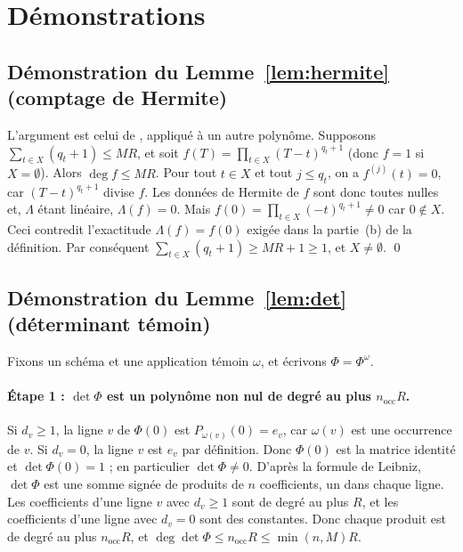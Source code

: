 \documentclass[11pt,a4paper]{article}
\theoremstyle{definition}
\theoremstyle{remark}
\newcommand{\nocc}{n_{\mathrm{occ}}}
\begin{document}
\section{Démonstrations}\label{sec:proofs}

\subsection{Démonstration du Lemme~\ref{lem:hermite} (comptage de Hermite)}

L'argument est celui de \cite[Lemme~6.2]{DL}, appliqué à un autre polynôme. Supposons
$\sum_{t\in X}(q_t+1)\le MR$, et soit $f(T)=\prod_{t\in X}(T-t)^{q_t+1}$ (donc $f=1$ si
$X=\emptyset$). Alors $\deg f\le MR$. Pour tout $t\in X$ et tout $j\le q_t$, on a
$f^{(j)}(t)=0$, car $(T-t)^{q_t+1}$ divise $f$. Les données de Hermite de $f$ sont donc
toutes nulles et, $\Lambda$ étant linéaire, $\Lambda(f)=0$. Mais
$f(0)=\prod_{t\in X}(-t)^{q_t+1}\ne0$ car $0\notin X$. Ceci contredit l'exactitude
$\Lambda(f)=f(0)$ exigée dans la partie~(b) de la définition. Par conséquent
$\sum_{t\in X}(q_t+1)\ge MR+1\ge1$, et $X\ne\emptyset$. \qed

\subsection{Démonstration du Lemme~\ref{lem:det} (déterminant témoin)}

Fixons un schéma et une application témoin $\omega$, et écrivons $\Phi=\Phi^\omega$.

\paragraph{Étape 1 : $\det\Phi$ est un polynôme non nul de degré au plus $\nocc R$.} Si
$d_v\ge1$, la ligne $v$ de $\Phi(0)$ est $P_{\omega(v)}(0)=e_v$, car $\omega(v)$ est une
occurrence de $v$. Si $d_v=0$, la ligne $v$ est $e_v$ par définition. Donc $\Phi(0)$ est la
matrice identité et $\det\Phi(0)=1$ ; en particulier $\det\Phi\ne0$. D'après la formule de
Leibniz, $\det\Phi$ est une somme signée de produits de $n$ coefficients, un dans chaque
ligne. Les coefficients d'une ligne $v$ avec $d_v\ge1$ sont de degré au plus $R$, et les
coefficients d'une ligne avec $d_v=0$ sont des constantes. Donc chaque produit est de degré
au plus $\nocc R$, et $\deg\det\Phi\le\nocc R\le\min(n,M)R$.
\end{document}
